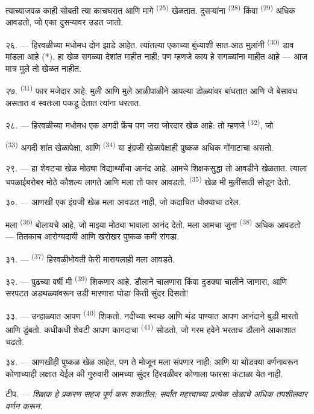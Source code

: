 त्याच्याजवळ काही सोबती त्या काचघरात आणि  मागे
\textsuperscript{(25)} खेळतात. दुसऱ्यांना \textsuperscript{(28)} किंवा \textsuperscript{(29)} अधिक
आवडतो, जो एका  दुसऱ्यावर उडत जातो.

२६. --- हिरवळीच्या मधोमध दोन झाडे आहेत. त्यांतल्या एकाच्या बुंध्याशी सात-आठ मुलांनी
\textsuperscript{(30)} डाव मांडला आहे (*). हा खेळ सगळ्या
देशांत माहीत नाही; पण  म्हणजे काय हे सगळ्यांना माहीत आहे ---
आज मात्र मुले तो खेळत नाहीत.

\VUsaut{5.0mm}
\VUsaut{3.4mm}

२७. \textsuperscript{(31)} फार मजेदार आहे; मुली आणि मुले
आळीपाळीने आपल्या डोळ्यांवर  बांधतात आणि जे बेसावध असतात व स्वतःला
पकडू देतात त्यांना धरतात.

२८. --- हिरवळीच्या मधोमध एक अगदी फ्रेंच पण जरा जोरदार खेळ आहे: तो म्हणजे
\textsuperscript{(32)}, जो

\textsuperscript{(33)} अगदी शांत खेळापेक्षा, आणि
\textsuperscript{(34)} या इंग्रजी खेळापेक्षाही पुष्कळ अधिक गोंगाटाचा
असतो.

२९. --- हा शेवटचा खेळ मोठ्या विद्यार्थ्यांचा आनंद आहे. आमचे शिक्षकसुद्धा तो
आवडीने खेळतात. त्याला चपळाईबरोबर मोठे कौशल्य लागते आणि मला तो फार आवडतो.
\textsuperscript{(35)} खेळ मी मुलींसाठी सोडून देतो.

३०. --- आणखी एक इंग्रजी खेळ मला आवडत नाही, जो कदाचित धोक्याचा ठरेल.

मला \textsuperscript{(36)} बोलायचे आहे, जो माझ्या मोठ्या भावाला
आनंद देतो. मला आमचा जुना \textsuperscript{(38)} अधिक आवडतो --- तितकाच
आरोग्यदायी आणि खरोखर पुष्कळ कमी रांगडा.

\VUsaut{4.6mm}
\VUsaut{3.0mm}

३१. --- \textsuperscript{(37)} हिरवळीभोवती फेरी मारायलाही मला
आवडते.

३२. --- पुढच्या वर्षी मी \textsuperscript{(39)} शिकणार आहे. डौलाने
चालणारा किंवा दुडक्या चालीने जाणारा, आणि सरपटत अडथळ्यांवरून उडी मारणारा घोडा
किती सुंदर दिसतो!

३३. --- उन्हाळ्यात आपण \textsuperscript{(40)} शिकतो. नदीच्या स्वच्छ
आणि थंड पाण्यात आपण आनंदाने बुडी मारतो आणि डुंबतो. कधीकधी शेवटी आपण कागदाचा
\textsuperscript{(41)} सोडतो, जो गरम हवेने भरताच डौलाने आकाशात चढतो.

३४. --- आणखीही पुष्कळ खेळ आहेत, पण ते मोजून मला संपणार नाही; आणि या थोडक्या
वर्णनावरून कोणाच्याही लक्षात येईल की गुरुवारी आमच्या सुंदर हिरवळीवर कोणाला
फारसा कंटाळा येत नाही.

टीप. --- \textit{शिक्षक हे प्रकरण सहज पूर्ण करू शकतील; सर्वांत महत्त्वाच्या
प्रत्येक खेळाचे अधिक तपशीलवार वर्णन करून.}
